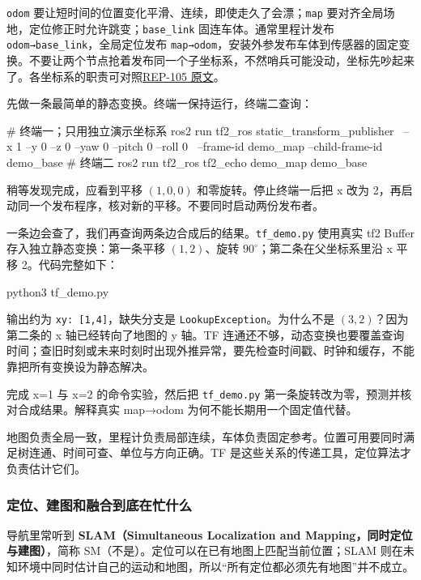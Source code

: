 \texttt{odom} 要让短时间的位置变化平滑、连续，即使走久了会漂；\texttt{map} 要对齐全局场地，定位修正时允许跳变；\texttt{base\_link} 固连车体。通常里程计发布 \texttt{odom→base\_link}，全局定位发布 \texttt{map→odom}，安装外参发布车体到传感器的固定变换。不要让两个节点抢着发布同一个子坐标系，不然哨兵可能没动，坐标先吵起来了。各坐标系的职责可对照\href{https://github.com/ros-infrastructure/rep/blob/master/rep-0105.rst}{REP-105 原文}。

\begin{example}
先做一条最简单的静态变换。终端一保持运行，终端二查询：
\begin{tbash}
# 终端一；只用独立演示坐标系
ros2 run tf2_ros static_transform_publisher \
  --x 1 --y 0 --z 0 --yaw 0 --pitch 0 --roll 0 \
  --frame-id demo_map --child-frame-id demo_base
# 终端二
ros2 run tf2_ros tf2_echo demo_map demo_base
\end{tbash}
稍等发现完成，应看到平移 $(1,0,0)$ 和零旋转。停止终端一后把 x 改为 2，再启动同一个发布程序，核对新的平移。不要同时启动两份发布者。
\end{example}

\begin{example}
一条边会查了，我们再查询两条边合成后的结果。\texttt{tf\_demo.py} 使用真实 tf2 Buffer 存入独立静态变换：第一条平移 $(1,2)$、旋转 $90^\circ$；第二条在父坐标系里沿 x 平移 2。代码完整如下：

\begin{tbash}
python3 tf_demo.py
\end{tbash}
输出约为 \texttt{xy: [1,4]}，缺失分支是 \texttt{LookupException}。为什么不是 $(3,2)$？因为第二条的 x 轴已经转向了地图的 y 轴。TF 连通还不够，动态变换也要覆盖查询时间；查旧时刻或未来时刻时出现外推异常，要先检查时间戳、时钟和缓存，不能靠把所有变换设为静态解决。
\end{example}
\begin{exercise}\label{ex:nav-tf}
完成 x=1 与 x=2 的命令实验，然后把 \texttt{tf\_demo.py} 第一条旋转改为零，预测并核对合成结果。解释真实 map→odom 为何不能长期用一个固定值代替。
\end{exercise}
\begin{conclusion}
地图负责全局一致，里程计负责局部连续，车体负责固定参考。位置可用要同时满足树连通、时间可查、单位与方向正确。TF 是这些关系的传递工具，定位算法才负责估计它们。
\end{conclusion}

\subsubsection{定位、建图和融合到底在忙什么}
导航里常听到 \textbf{SLAM（Simultaneous Localization and Mapping，同时定位与建图）}，简称 SM（不是）。定位可以在已有地图上匹配当前位置；SLAM 则在未知环境中同时估计自己的运动和地图，所以“所有定位都必须先有地图”并不成立。

